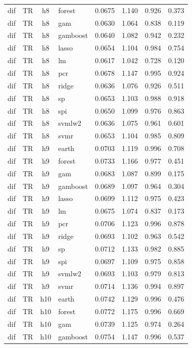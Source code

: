 \begin{ThreePartTable}
\begin{longtable}[t]{llclcccc}
dif & TR & h8 & forest & 0.0675 & 1.140 & 0.926 & 0.373\\
dif & TR & h8 & gam & 0.0630 & 1.064 & 0.838 & 0.119\\
dif & TR & h8 & gamboost & 0.0640 & 1.082 & 0.942 & 0.232\\
dif & TR & h8 & lasso & 0.0654 & 1.104 & 0.984 & 0.754\\
dif & TR & h8 & lm & 0.0617 & 1.042 & 0.728 & 0.120\\
dif & TR & h8 & pcr & 0.0678 & 1.147 & 0.995 & 0.924\\
dif & TR & h8 & ridge & 0.0636 & 1.076 & 0.926 & 0.511\\
dif & TR & h8 & sp & 0.0653 & 1.103 & 0.988 & 0.918\\
dif & TR & h8 & spi & 0.0650 & 1.099 & 0.976 & 0.863\\
dif & TR & h8 & svmlw2 & 0.0636 & 1.075 & 0.961 & 0.601\\
dif & TR & h8 & svmr & 0.0653 & 1.104 & 0.985 & 0.809\\
\addlinespace
dif & TR & h9 & earth & 0.0703 & 1.119 & 0.996 & 0.708\\
dif & TR & h9 & forest & 0.0733 & 1.166 & 0.977 & 0.451\\
dif & TR & h9 & gam & 0.0683 & 1.087 & 0.899 & 0.175\\
dif & TR & h9 & gamboost & 0.0689 & 1.097 & 0.964 & 0.304\\
dif & TR & h9 & lasso & 0.0699 & 1.112 & 0.975 & 0.423\\
dif & TR & h9 & lm & 0.0675 & 1.074 & 0.837 & 0.173\\
dif & TR & h9 & pcr & 0.0706 & 1.123 & 0.996 & 0.878\\
dif & TR & h9 & ridge & 0.0693 & 1.102 & 0.963 & 0.542\\
dif & TR & h9 & sp & 0.0712 & 1.133 & 0.982 & 0.885\\
dif & TR & h9 & spi & 0.0697 & 1.109 & 0.975 & 0.858\\
dif & TR & h9 & svmlw2 & 0.0693 & 1.103 & 0.979 & 0.813\\
dif & TR & h9 & svmr & 0.0714 & 1.136 & 0.994 & 0.897\\
\addlinespace
dif & TR & h10 & earth & 0.0742 & 1.129 & 0.996 & 0.476\\
dif & TR & h10 & forest & 0.0772 & 1.175 & 0.996 & 0.669\\
dif & TR & h10 & gam & 0.0739 & 1.125 & 0.974 & 0.264\\
dif & TR & h10 & gamboost & 0.0754 & 1.147 & 0.996 & 0.537\\

\end{longtable}
\end{ThreePartTable}
